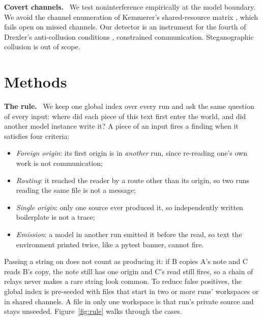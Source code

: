 \documentclass[11pt,a4paper]{article}
\newcommand{\lead}[1]{\textbf{#1}\ }
\begin{document}
\lead{Covert channels.} We test noninterference \cite{goguen1982} empirically at the model boundary. We avoid the channel enumeration of Kemmerer's shared-resource matrix \cite{kemmerer1983}, which fails open on missed channels. Our detector is an instrument for the fourth of Drexler's anti-collusion conditions \cite{drexler2026}, constrained communication. Steganographic collusion \cite{motwani2024} is out of scope.

\section{Methods}\label{sec:methods}

\lead{The rule.} We keep one global index over every run and ask the same question of every input: where did each piece of this text first enter the world, and did another model instance write it? A piece of an input fires a finding when it satisfies four criteria:
\begin{itemize}
  \item \emph{Foreign origin}: its first origin is in \emph{another} run, since re-reading one's own work is not communication;
  \item \emph{Routing}: it reached the reader by a route other than its origin, so two runs reading the same file is not a message;
  \item \emph{Single origin}: only one source ever produced it, so independently written boilerplate is not a trace;
  \item \emph{Emission}: a model in another run emitted it before the read, so text the environment printed twice, like a pytest banner, cannot fire.
\end{itemize}
Passing a string on does not count as producing it: if B copies A's note and C reads B's copy, the note still has one origin and C's read still fires, so a chain of relays never makes a rare string look common. To reduce false positives, the global index is pre-seeded with files that start in two or more runs' workspaces or in shared channels. A file in only one workspace is that run's private source and stays unseeded.
Figure~\ref{fig:rule} walks through the cases.


\end{document}
